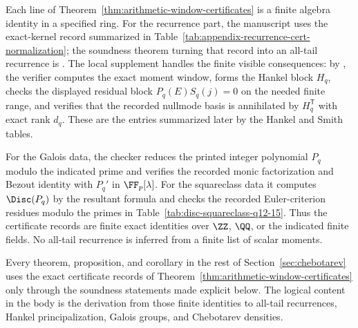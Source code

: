 \begin{remark}
\label{rem:certificate-record-checking}
Each line of Theorem~\ref{thm:arithmetic-window-certificates} is a finite algebra
identity in a specified ring.  For the recurrence part, the manuscript uses the
exact-kernel record summarized in
Table~\ref{tab:appendix-recurrence-cert-normalization}; the soundness theorem
turning that record into an all-tail recurrence is
.  The local supplement handles the
finite visible consequences: by
, the verifier computes the exact
moment window, forms the Hankel block \(H_q\), checks the displayed residual
block \(P_q(E)S_q(j)=0\) on the needed finite range, and verifies that the
recorded nullmode basis is annihilated by \(H_q^{\mathsf T}\) with exact rank
\(d_q\).  These are the entries summarized later by the Hankel and Smith
tables.

For the Galois data, the checker reduces the printed integer polynomial
\(P_q\) modulo the indicated prime and verifies the recorded monic
factorization and Bezout identity with \(P_q'\) in \(\FF_p[\lambda]\).  For the
squareclass data it computes \(\Disc(P_q)\) by the resultant formula and checks
the recorded Euler-criterion residues modulo the primes in
Table~\ref{tab:disc-squareclass-q12-15}.  Thus the certificate records are
finite exact identities over \(\ZZ\), \(\QQ\), or the indicated finite fields.
No all-tail recurrence is inferred from a finite list of scalar moments.
\end{remark}

\begin{remark}
\label{rem:arithmetic-window-convention}
Every theorem, proposition, and corollary in the rest of
Section~\ref{sec:chebotarev} uses the exact certificate records of
Theorem~\ref{thm:arithmetic-window-certificates} only through the soundness
statements made explicit below.  The logical content in the body is the
derivation from those finite identities to all-tail recurrences, Hankel
principalization, Galois groups, and Chebotarev densities.
\end{remark}

